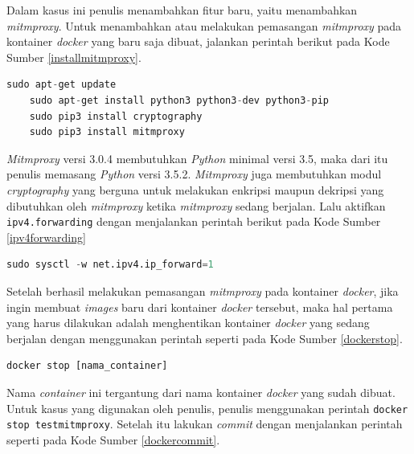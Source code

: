 	\indent Dalam kasus ini penulis menambahkan fitur baru, yaitu menambahkan \textit{mitmproxy}. Untuk menambahkan atau melakukan pemasangan \textit{mitmproxy} pada kontainer \textit{docker} yang baru saja dibuat, jalankan perintah berikut pada Kode Sumber \ref{installmitmproxy}.
	\newline
	\begin{minipage}{\linewidth}
	\begin{lstlisting}[caption=Perintah untuk Pemasangan \textit{Mitmproxy},language=Python,label=installmitmproxy]
	sudo apt-get update
	sudo apt-get install python3 python3-dev python3-pip
	sudo pip3 install cryptography
	sudo pip3 install mitmproxy
	\end{lstlisting}
	\end{minipage}
	
	\textit{Mitmproxy} versi 3.0.4 membutuhkan \textit{Python} minimal versi 3.5, maka dari itu penulis memasang \textit{Python} versi 3.5.2. \textit{Mitmproxy} juga membutuhkan modul \textit{cryptography} yang berguna untuk melakukan enkripsi maupun dekripsi yang dibutuhkan oleh \textit{mitmproxy} ketika \textit{mitmproxy} sedang berjalan. Lalu aktifkan \texttt{ipv4.forwarding} dengan menjalankan perintah berikut pada Kode Sumber \ref{ipv4forwarding}\\
	\newline
	\begin{minipage}{\linewidth}
	\begin{lstlisting}[caption=Perintah untuk Mengaktifkan \textit{ipv4.forwarding},language=Python,label=ipv4forwarding]
  sudo sysctl -w net.ipv4.ip_forward=1
	\end{lstlisting}
	\end{minipage}
	\indent Setelah berhasil melakukan pemasangan \textit{mitmproxy} pada kontainer \textit{docker}, jika ingin membuat \textit{images} baru dari kontainer \textit{docker} tersebut, maka hal pertama yang harus dilakukan adalah menghentikan kontainer \textit{docker} yang sedang berjalan dengan menggunakan perintah seperti pada Kode Sumber \ref{dockerstop}.
	\newline
	\begin{minipage}{\linewidth}
	\begin{lstlisting}[caption=Perintah untuk Menghentikan Kontainer \textit{Docker},language=Python,label=dockerstop]
	docker stop [nama_container]
	\end{lstlisting}
	\end{minipage}
	Nama \textit{container} ini tergantung dari nama kontainer \textit{docker} yang sudah dibuat. Untuk kasus yang digunakan oleh penulis, penulis menggunakan perintah \texttt{docker stop testmitmproxy}. Setelah itu lakukan \textit{commit} dengan menjalankan perintah seperti pada Kode Sumber \ref{dockercommit}.
